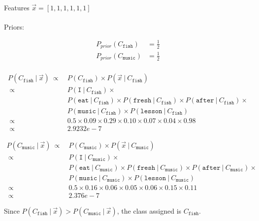 \documentclass{article}
\newcommand\given[1][]{\:#1\vert\:}
\begin{document}
\paragraph{} Features $\vec{x} = [1, 1, 1, 1, 1, 1]$

\paragraph{} Priors:

\begin{equation}
    \begin{split}
        P_{prior}(C_{\texttt{fish}}) &= \frac{1}{2} \\
        P_{prior}(C_{\texttt{music}}) &= \frac{1}{2} \\
    \end{split}
\end{equation}

\begin{equation}
    \begin{split}
        P(C_{\texttt{fish}} \given \vec{x})\ \mathbin{\propto}&\ P(C_{\texttt{fish}}) \times P(\vec{x} \given C_{\texttt{fish}}) \\
        \ \mathbin{\propto}&\ P(\texttt{I} \given C_{\texttt{fish}}) \times \\
        &\ P(\texttt{eat} \given C_{\texttt{fish}}) \times P(\texttt{fresh}  \given C_{\texttt{fish}}) \times P(\texttt{after} \given C_{\texttt{fish}}) \times \\
        &\ P(\texttt{music} \given C_{\texttt{fish}}) \times P(\texttt{lesson} \given C_{\texttt{fish}}) \\
        \ \mathbin{\propto}&\ 0.5 \times 0.09 \times 0.29 \times 0.10 \times 0.07 \times 0.04 \times 0.98 \\
        \ \mathbin{\propto}&\ 2.9232e-7
    \end{split}
\end{equation}

\begin{equation}
    \begin{split}
        P(C_{\texttt{music}} \given \vec{x})\ \mathbin{\propto}&\ P(C_{\texttt{music}}) \times P(\vec{x} \given C_{\texttt{music}}) \\
        \ \mathbin{\propto}&\ P(\texttt{I} \given C_{\texttt{music}}) \times \\
        &\ P(\texttt{eat} \given C_{\texttt{music}}) \times P(\texttt{fresh} \given C_{\texttt{music}}) \times P(\texttt{after} \given C_{\texttt{music}}) \times \\
        &\ P(\texttt{music} \given C_{\texttt{music}}) \times P(\texttt{lesson} \given C_{\texttt{music}}) \\
        \ \mathbin{\propto}&\ 0.5 \times 0.16 \times 0.06 \times 0.05 \times 0.06 \times 0.15 \times 0.11 \\
        \ \mathbin{\propto}&\ 2.376e-7
    \end{split}
\end{equation}

Since $P(C_{\texttt{fish}} \given \vec{x}) > P(C_{\texttt{music}} \given \vec{x})$, the class assigned is $C_{\texttt{fish}}$.
\end{document}
